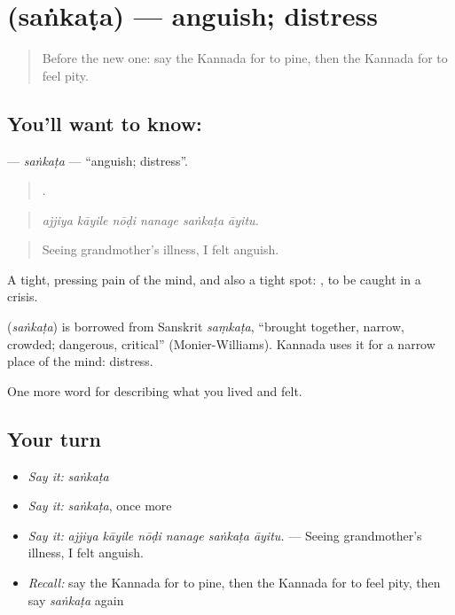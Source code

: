 \section[\texorpdfstring{\kn{ಸಂಕಟ} (saṅkaṭa)}{ಸಂಕಟ (saṅkaṭa)}]{ (saṅkaṭa) — anguish; distress}

\label{lesson:KA-C491-sankata}



\begin{quote}
Before the new one: say the Kannada for to pine, then the Kannada for to feel pity.
\end{quote}

\subsection*{You'll want to know: }
\textbf{} — \emph{saṅkaṭa} — \textquotedblleft{}anguish; distress\textquotedblright{}.

\begin{quote}
     .
\end{quote}

\begin{quote}
\emph{ajjiya kāyile nōḍi nanage saṅkaṭa āyitu.}
\end{quote}

\begin{quote}
Seeing grandmother's illness, I felt anguish.
\end{quote}

A tight, pressing pain of the mind, and also a tight spot:  , to be caught in a crisis.

\begin{cousinweb}
\textbf{} (\emph{saṅkaṭa}) is borrowed from Sanskrit \emph{saṃkaṭa}, \textquotedblleft{}brought together, narrow, crowded; dangerous, critical\textquotedblright{} (Monier-Williams). Kannada uses it for a narrow place of the mind: distress.
\end{cousinweb}

\begin{grammarlens}[title={What you've built}]
One more word for describing what you lived and felt.
\end{grammarlens}

\subsection*{Your turn}
\begin{itemize}
\raggedright
  \item \emph{Say it:} \emph{saṅkaṭa}
  \item \emph{Say it:} \emph{saṅkaṭa}, once more
  \item \emph{Say it:} \emph{ajjiya kāyile nōḍi nanage saṅkaṭa āyitu.} — Seeing grandmother's illness, I felt anguish.
  \item \emph{Recall:} say the Kannada for to pine, then the Kannada for to feel pity, then say \emph{saṅkaṭa} again
\end{itemize}

